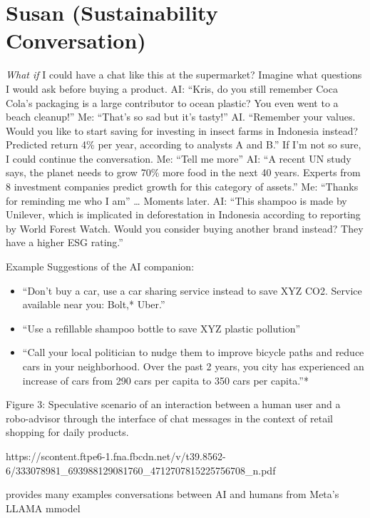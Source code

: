 \documentclass[
  letterpaper,
  DIV=11,
  numbers=noendperiod]{scrartcl}
\begin{document}
\section{Susan (Sustainability
Conversation)}\label{susan-sustainability-conversation}

\emph{What if} I could have a chat like this at the supermarket? Imagine
what questions I would ask before buying a product. AI: ``Kris, do you
still remember Coca Cola's packaging is a large contributor to ocean
plastic? You even went to a beach cleanup!'' Me: ``That's so sad but
it's tasty!'' AI. ``Remember your values. Would you like to start saving
for investing in insect farms in Indonesia instead? Predicted return 4\%
per year, according to analysts A and B.'' If I'm not so sure, I could
continue the conversation. Me: ``Tell me more'' AI: ``A recent UN study
says, the planet needs to grow 70\% more food in the next 40 years.
Experts from 8 investment companies predict growth for this category of
assets.'' Me: ``Thanks for reminding me who I am'' \ldots{} Moments
later. AI: ``This shampoo is made by Unilever, which is implicated in
deforestation in Indonesia according to reporting by World Forest Watch.
Would you consider buying another brand instead? They have a higher ESG
rating.''

Example Suggestions of the AI companion:

\begin{itemize}
\item
  ``Don't buy a car, use a car sharing service instead to save XYZ CO2.
  Service available near you: Bolt,* Uber.''
\item
  ``Use a refillable shampoo bottle to save XYZ plastic pollution''
\item
  ``Call your local politician to nudge them to improve bicycle paths
  and reduce cars in your neighborhood. Over the past 2 years, you city
  has experienced an increase of cars from 290 cars per capita to 350
  cars per capita.''*
\end{itemize}

Figure 3: Speculative scenario of an interaction between a human user
and a robo-advisor through the interface of chat messages in the context
of retail shopping for daily products.

https://scontent.ftpe6-1.fna.fbcdn.net/v/t39.8562-6/333078981\_693988129081760\_4712707815225756708\_n.pdf

provides many examples conversations between AI and humans from Meta's
LLAMA mmodel
\end{document}
